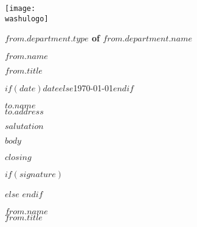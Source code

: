 \documentclass{article}
\begin{document}
\texttt{[image: \\washulogo]} \bigskip

\hspace{0.4in}\textbf{$from.department.type$ of $from.department.name$} \bigskip

\hspace{0.4in}\textbf{$from.name$} \par
\hspace{0.4in}\emph{$from.title$} \vspace{4\baselineskip}

$if(date)$$date$$else$\today$endif$ \vspace{3\baselineskip}

$to.name$ \\
$to.address$ \bigskip

$salutation$ \bigskip

$body$ \bigskip

$closing$

\vspace{1\baselineskip}

$if(signature)$
 \par
$else$
\vspace{1\baselineskip}
$endif$

\vspace{1\baselineskip}

$from.name$ \\
$from.title$
\end{document}
